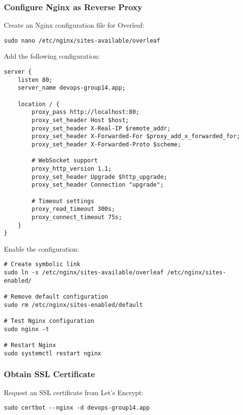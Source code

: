 \subsubsection{Configure Nginx as Reverse Proxy}

Create an Nginx configuration file for Overleaf:

\begin{verbatim}
sudo nano /etc/nginx/sites-available/overleaf
\end{verbatim}

Add the following configuration:

\begin{verbatim}
server {
    listen 80;
    server_name devops-group14.app;

    location / {
        proxy_pass http://localhost:80;
        proxy_set_header Host $host;
        proxy_set_header X-Real-IP $remote_addr;
        proxy_set_header X-Forwarded-For $proxy_add_x_forwarded_for;
        proxy_set_header X-Forwarded-Proto $scheme;
        
        # WebSocket support
        proxy_http_version 1.1;
        proxy_set_header Upgrade $http_upgrade;
        proxy_set_header Connection "upgrade";
        
        # Timeout settings
        proxy_read_timeout 300s;
        proxy_connect_timeout 75s;
    }
}
\end{verbatim}

Enable the configuration:

\begin{verbatim}
# Create symbolic link
sudo ln -s /etc/nginx/sites-available/overleaf /etc/nginx/sites-enabled/

# Remove default configuration
sudo rm /etc/nginx/sites-enabled/default

# Test Nginx configuration
sudo nginx -t

# Restart Nginx
sudo systemctl restart nginx
\end{verbatim}

\subsubsection{Obtain SSL Certificate}

Request an SSL certificate from Let's Encrypt:

\begin{verbatim}
sudo certbot --nginx -d devops-group14.app
\end{verbatim}

